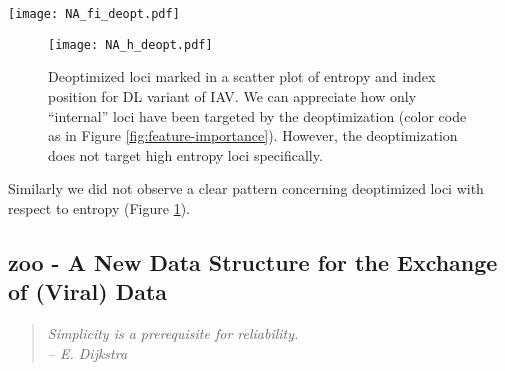 \begin{SCfigure}
  \centering
  \caption[Deoptimized loci mapped to learned feature importances.]{Deoptimized loci mapped to learned feature importances for the ``DL'' variant (other variants not shown). The position-wise FI (light red) was learned from the above described host species prediction task using GBTs. We then superimposed the loci that had been subject to codon deoptimization (in dark red). While some loci with high FI have been targeted, we could observe no clear link between the FI of targeted loci and the resulting viability phenotype of the IAV variants (see plaque score in Figure \ref{tab:deopt-experiments}). FI is scaled by square root ($\sqrt{F}$) for easier visual inspection. Modified label 0: no, 1: yes, i: index. Note that the 4 facets \{A, C, T, G\} result from the one-hot encoding, where each sequence locus is transformed into 4 features. Each of those features could be informally translated as asking: ``Is a given nucleotide present at this locus?''.}
  \label{fig:feature-importance}
  \texttt{[image: NA\_fi\_deopt.pdf]}
\end{SCfigure}


\begin{figure} %
    \begin{center}\texttt{[image: NA\_h\_deopt.pdf]}\end{center}
    \caption[Deoptimized loci marked in a scatter plot of entropy and index position.]{Deoptimized loci marked in a scatter plot of entropy and index position for DL variant of IAV. We can appreciate how only ``internal'' loci have been targeted by the deoptimization (color code as in Figure \ref{fig:feature-importance}). However, the deoptimization does not target high entropy loci specifically.}
    \label{fig:entropy}
\end{figure}


Similarly we did not observe a clear pattern concerning deoptimized loci with respect to entropy (Figure \ref{fig:entropy}).


\newpage


\subsection{zoo - A New Data Structure for the Exchange of (Viral) Data}

\begin{quotation}
\emph{Simplicity is a prerequisite for reliability.\\
-- E. Dijkstra}
\end{quotation}

